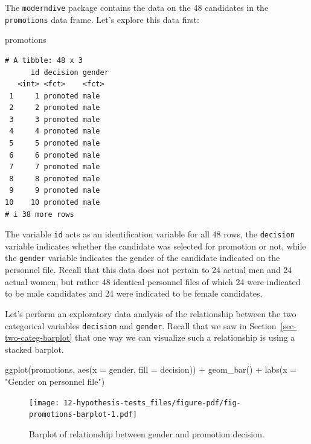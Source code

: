 \documentclass[
  letterpaper,
  DIV=11,
  numbers=noendperiod]{scrreprt}
\newenvironment{Shaded}{\begin{snugshade}}{\end{snugshade}}
\newcommand{\AttributeTok}[1]{\textcolor[rgb]{0.40,0.45,0.13}{#1}}
\newcommand{\FunctionTok}[1]{\textcolor[rgb]{0.28,0.35,0.67}{#1}}
\newcommand{\NormalTok}[1]{\textcolor[rgb]{0.00,0.23,0.31}{#1}}
\newcommand{\SpecialCharTok}[1]{\textcolor[rgb]{0.37,0.37,0.37}{#1}}
\newcommand{\StringTok}[1]{\textcolor[rgb]{0.13,0.47,0.30}{#1}}
\theoremstyle{definition}
\theoremstyle{remark}
\begin{document}
The \texttt{moderndive} package contains the data on the 48 candidates
in the \texttt{promotions} data frame. Let's explore this data first:

\begin{Shaded}
\begin{Highlighting}[]
\NormalTok{promotions}
\end{Highlighting}
\end{Shaded}

\begin{verbatim}
# A tibble: 48 x 3
      id decision gender
   <int> <fct>    <fct> 
 1     1 promoted male  
 2     2 promoted male  
 3     3 promoted male  
 4     4 promoted male  
 5     5 promoted male  
 6     6 promoted male  
 7     7 promoted male  
 8     8 promoted male  
 9     9 promoted male  
10    10 promoted male  
# i 38 more rows
\end{verbatim}

The variable \texttt{id} acts as an identification variable for all 48
rows, the \texttt{decision} variable indicates whether the candidate was
selected for promotion or not, while the \texttt{gender} variable
indicates the gender of the candidate indicated on the personnel file.
Recall that this data does not pertain to 24 actual men and 24 actual
women, but rather 48 identical personnel files of which 24 were
indicated to be male candidates and 24 were indicated to be female
candidates.

Let's perform an exploratory data analysis of the relationship between
the two categorical variables \texttt{decision} and \texttt{gender}.
Recall that we saw in Section~\ref{sec-two-categ-barplot} that one way
we can visualize such a relationship is using a stacked barplot.

\begin{Shaded}
\begin{Highlighting}[]
\FunctionTok{ggplot}\NormalTok{(promotions, }\FunctionTok{aes}\NormalTok{(}\AttributeTok{x =}\NormalTok{ gender, }\AttributeTok{fill =}\NormalTok{ decision)) }\SpecialCharTok{+}
  \FunctionTok{geom\_bar}\NormalTok{() }\SpecialCharTok{+}
  \FunctionTok{labs}\NormalTok{(}\AttributeTok{x =} \StringTok{"Gender on personnel file"}\NormalTok{)}
\end{Highlighting}
\end{Shaded}

\begin{figure}[H]

{\centering \texttt{[image: 12-hypothesis-tests\_files/figure-pdf/fig-promotions-barplot-1.pdf]}

}

\caption{\label{fig-promotions-barplot}Barplot of relationship between
gender and promotion decision.}

\end{figure}
\end{document}
